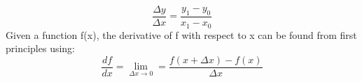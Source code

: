 \documentclass{article}
\begin{document}
\begin{displaymath}
\frac{\Delta y}{\Delta x} = \frac{y_{1} - y_{0}}{x_{1} - x_{0}}
\end{displaymath}
Given a function f(x), the derivative of f with respect to x can be found from first
principles using:
\begin{displaymath}
\frac{df}{dx} = \lim_{\Delta x\rightarrow 0} = \frac{f(x+\Delta x) - f(x)}{\Delta x}
\end{displaymath}
\end{document}
